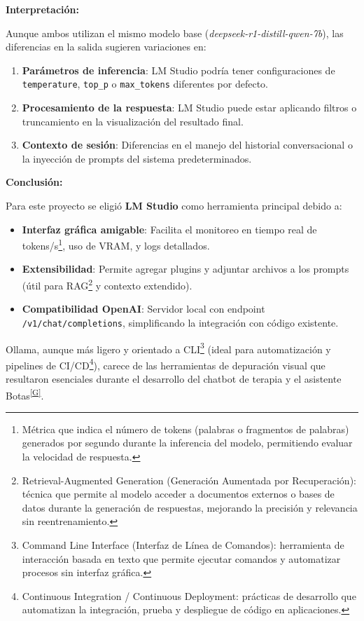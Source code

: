 \documentclass[12pt,a4paper]{report}
\numberwithin{figure}{section}
\begin{document}
\textbf{Interpretación:}

Aunque ambos utilizan el mismo modelo base (\textit{deepseek-r1-distill-qwen-7b}), las diferencias en la salida sugieren variaciones en:
\begin{enumerate}
    \item \textbf{Parámetros de inferencia}: LM Studio podría tener configuraciones de \texttt{temperature}, \texttt{top\_p} o \texttt{max\_tokens} diferentes por defecto.
    \item \textbf{Procesamiento de la respuesta}: LM Studio puede estar aplicando filtros o truncamiento en la visualización del resultado final.
    \item \textbf{Contexto de sesión}: Diferencias en el manejo del historial conversacional o la inyección de prompts del sistema predeterminados.
\end{enumerate}

\textbf{Conclusión:}

Para este proyecto se eligió \textbf{LM Studio} como herramienta principal debido a:
\begin{itemize}
    \item \textbf{Interfaz gráfica amigable}: Facilita el monitoreo en tiempo real de tokens/s\footnote{Métrica que indica el número de tokens (palabras o fragmentos de palabras) generados por segundo durante la inferencia del modelo, permitiendo evaluar la velocidad de respuesta.}, uso de VRAM, y logs detallados.
    \item \textbf{Extensibilidad}: Permite agregar plugins y adjuntar archivos a los prompts (útil para RAG\footnote{Retrieval-Augmented Generation (Generación Aumentada por Recuperación): técnica que permite al modelo acceder a documentos externos o bases de datos durante la generación de respuestas, mejorando la precisión y relevancia sin reentrenamiento.} y contexto extendido).
    \item \textbf{Compatibilidad OpenAI}: Servidor local con endpoint \texttt{/v1/chat/completions}, simplificando la integración con código existente.
\end{itemize}

Ollama, aunque más ligero y orientado a CLI\footnote{Command Line Interface (Interfaz de Línea de Comandos): herramienta de interacción basada en texto que permite ejecutar comandos y automatizar procesos sin interfaz gráfica.} (ideal para automatización y pipelines de CI/CD\footnote{Continuous Integration / Continuous Deployment: prácticas de desarrollo que automatizan la integración, prueba y despliegue de código en aplicaciones.}), carece de las herramientas de depuración visual que resultaron esenciales durante el desarrollo del chatbot de terapia y el asistente Botas\textsuperscript{\hyperref[glos:botas]{[G]}}.
\end{document}
